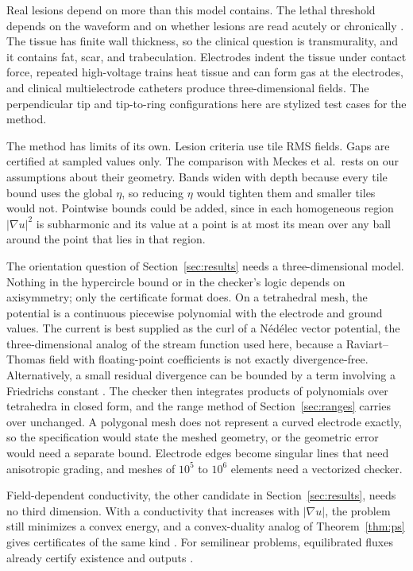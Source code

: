 \documentclass[11pt]{article}
\begin{document}
Real lesions depend on more than this model contains. The lethal threshold
depends on the waveform and on whether lesions are read acutely or chronically
\cite{kotnik2019,verma2021}. The tissue has finite wall thickness, so the
clinical question is transmurality, and it contains fat, scar, and trabeculation.
Electrodes indent the tissue under contact force, repeated high-voltage trains
heat tissue and can form gas at the electrodes, and clinical multielectrode
catheters produce three-dimensional fields. The perpendicular tip and
tip-to-ring configurations here are stylized test cases for the method.

The method has limits of its own. Lesion criteria use tile RMS fields. Gaps are
certified at sampled values only. The comparison with Meckes et al.\ rests on
our assumptions about their geometry. Bands widen with depth because every tile
bound uses the global $\eta$, so reducing $\eta$ would tighten them and smaller
tiles would not. Pointwise bounds could be added, since in each homogeneous
region $|\nabla u|^2$ is subharmonic and its value at a point is at most its
mean over any ball around the point that lies in that region.

The orientation question of Section~\ref{sec:results} needs a three-dimensional
model. Nothing in the hypercircle bound or in the checker's logic depends on axisymmetry;
only the certificate format does. On a tetrahedral mesh,
the potential is a continuous piecewise polynomial with the electrode and ground
values. The current is best supplied as the curl of a N\'ed\'elec vector
potential, the three-dimensional analog of the stream function used here,
because a Raviart--Thomas field with floating-point coefficients is not exactly
divergence-free. Alternatively, a small residual divergence can be bounded by a
term involving a Friedrichs constant \cite{repin2008}. The checker then
integrates products of polynomials over tetrahedra in closed form, and the range
method of Section~\ref{sec:ranges} carries over unchanged. A polygonal mesh does not
represent a curved electrode exactly, so the specification would state the meshed
geometry, or the geometric error would need a separate bound. Electrode edges become
singular lines that need anisotropic grading, and meshes of $10^5$ to $10^6$
elements need a vectorized checker.

Field-dependent conductivity, the other candidate in
Section~\ref{sec:results}, needs no third dimension. With a conductivity that
increases with $|\nabla u|$, the problem still minimizes a convex energy, and a
convex-duality analog of Theorem~\ref{thm:ps} gives certificates of the same
kind \cite{repin2008}. For semilinear problems, equilibrated fluxes already
certify existence and outputs \cite{ishizaka2026}.
\end{document}

